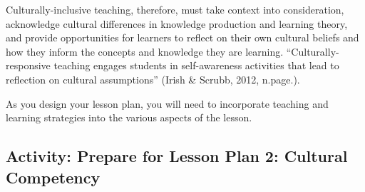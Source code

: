 \documentclass[
]{book}
\begin{document}
Culturally-inclusive teaching, therefore, must take context into consideration, acknowledge cultural differences in knowledge production and learning theory, and provide opportunities for learners to reflect on their own cultural beliefs and how they inform the concepts and knowledge they are learning. ``Culturally-responsive teaching engages students in self-awareness activities that lead to reflection on cultural assumptions'' (Irish \& Scrubb, 2012, n.page.).

As you design your lesson plan, you will need to incorporate teaching and learning strategies into the various aspects of the lesson.

\hypertarget{activity-prepare-for-lesson-plan-2-cultural-competency}{%
\subsection{Activity: Prepare for Lesson Plan 2: Cultural Competency}\label{activity-prepare-for-lesson-plan-2-cultural-competency}}
\end{document}
